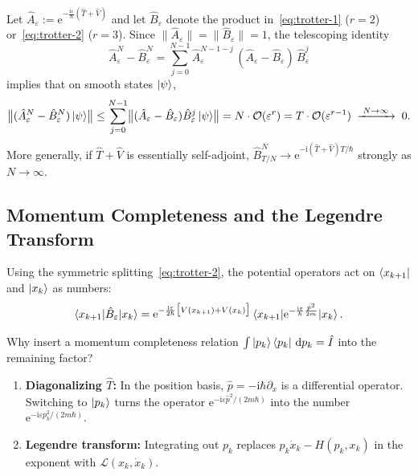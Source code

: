 \documentclass[11pt,a4paper]{article}
\newcommand{\ii}{\mathrm{i}}
\newcommand{\dd}{\mathrm{d}}
\newcommand{\ee}{\mathrm{e}}
\newcommand{\Lag}{\mathcal{L}}
\newcommand{\order}{\mathcal{O}}
\begin{document}
\begin{propositionbox}
Let $\hat A_\varepsilon := \ee^{-\frac{\ii\varepsilon}{\hbar}(\hat T+\hat V)}$ and let $\hat B_\varepsilon$ denote the product in~\eqref{eq:trotter-1} ($r=2$) or~\eqref{eq:trotter-2} ($r=3$). Since $\|\hat A_\varepsilon\|=\|\hat B_\varepsilon\|=1$, the telescoping identity
\begin{equation}
    \hat A_\varepsilon^N - \hat B_\varepsilon^N
    = \sum_{j=0}^{N-1} \hat A_\varepsilon^{N-1-j}\,(\hat A_\varepsilon - \hat B_\varepsilon)\,\hat B_\varepsilon^{j}
\end{equation}
implies that on smooth states $\ket{\psi}$,
\begin{equation}
    \bigl\|(\hat A_\varepsilon^N - \hat B_\varepsilon^N)\ket{\psi}\bigr\|
    \le \sum_{j=0}^{N-1}\bigl\|(\hat A_\varepsilon - \hat B_\varepsilon)\hat B_\varepsilon^j\ket{\psi}\bigr\|
    = N\cdot\order(\varepsilon^r) = T\cdot\order(\varepsilon^{r-1}) \;\xrightarrow{\;N\to\infty\;}\; 0.
\end{equation}
More generally, if $\hat T+\hat V$ is essentially self-adjoint, $\hat B_{T/N}^N \to \ee^{-\ii(\hat T+\hat V)T/\hbar}$ strongly as $N\to\infty$.
\end{propositionbox}

\subsection{Momentum Completeness and the Legendre Transform}

Using the symmetric splitting~\eqref{eq:trotter-2}, the potential operators act on $\bra{x_{k+1}}$ and $\ket{x_k}$ as numbers:
\begin{equation}
    \braket{x_{k+1}|\hat B_\varepsilon|x_k}
    = \ee^{-\frac{\ii\varepsilon}{2\hbar}\bigl[V(x_{k+1})+V(x_k)\bigr]}
      \braket{x_{k+1}|\ee^{-\frac{\ii\varepsilon}{\hbar}\frac{\hat p^2}{2m}}|x_k}.
    \label{eq:pot-factored}
\end{equation}

Why insert a momentum completeness relation $\int\ket{p_k}\bra{p_k}\,\dd p_k = \hat I$ into the remaining factor?
\begin{enumerate}[leftmargin=1.5em, itemsep=2pt]
    \item \textbf{Diagonalizing $\hat T$:} In the position basis, $\hat p = -\ii\hbar\partial_x$ is a differential operator. Switching to $\ket{p_k}$ turns the operator $\ee^{-\ii\varepsilon\hat p^2/(2m\hbar)}$ into the number $\ee^{-\ii\varepsilon p_k^2/(2m\hbar)}$.
    \item \textbf{Legendre transform:} Integrating out $p_k$ replaces $p_k\dot x_k - H(p_k,x_k)$ in the exponent with $\Lag(x_k,\dot x_k)$.
\end{enumerate}
\end{document}

